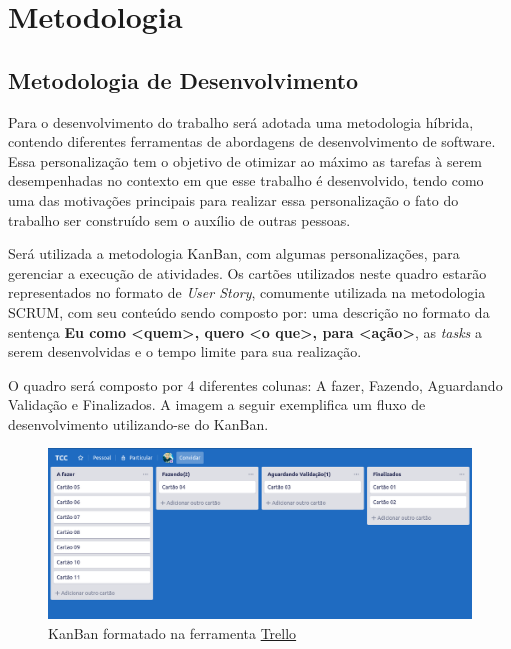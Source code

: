 \chapter[Metodologia]{Metodologia}

\section{Metodologia de Desenvolvimento}

Para o desenvolvimento do trabalho será adotada uma metodologia híbrida, contendo diferentes ferramentas de abordagens de desenvolvimento de software. Essa personalização tem o objetivo de otimizar ao máximo as tarefas à serem desempenhadas no contexto em que esse trabalho é desenvolvido, tendo como uma das motivações principais para realizar essa personalização o fato do trabalho ser construído sem o auxílio de outras pessoas.

Será utilizada a metodologia KanBan, com algumas personalizações, para gerenciar a execução de atividades. Os cartões utilizados neste quadro estarão representados no formato de \textit{User Story}, comumente utilizada na metodologia SCRUM, com seu conteúdo sendo composto por: uma descrição no formato da sentença \textbf{Eu como <quem>, quero <o que>, para <ação>}, as \textit{tasks} a serem desenvolvidas e o tempo limite para sua realização.

O quadro será composto por 4 diferentes colunas: A fazer, Fazendo, Aguardando Validação e Finalizados. A imagem a seguir exemplifica um fluxo de desenvolvimento utilizando-se do KanBan.

    \begin{figure}[H]
         \centering
         \includegraphics[scale=0.4]{figuras/capitulo_4/kanban_exemplo.png}
         \caption{KanBan formatado na ferramenta \href{https://trello.com/}{Trello}}
         \label{fig:kanban_trello_exe}
    \end{figure}

